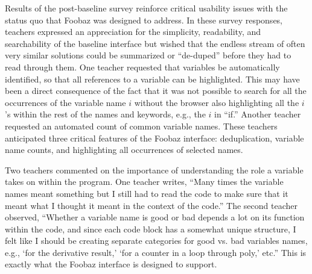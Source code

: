 \documentclass[12pt,twoside]{mitthesis}
\providecommand{\DIFaddtex}[1]{{\protect\color{blue}\uwave{#1}}} %
\providecommand{\DIFdeltex}[1]{{\protect\color{red}\sout{#1}}}                      %
\providecommand{\DIFaddbegin}{} %
\providecommand{\DIFaddend}{} %
\providecommand{\DIFdelbegin}{} %
\providecommand{\DIFdelend}{} %
\providecommand{\DIFadd}[1]{\texorpdfstring{\DIFaddtex{#1}}{#1}} %
\providecommand{\DIFdel}[1]{\texorpdfstring{\DIFdeltex{#1}}{}} %
\begin{document}
{{{{{{{{{{Results of the post-baseline survey reinforce critical usability issues with the status quo that Foobaz was designed to address. In these survey responses, teachers expressed an appreciation for the simplicity, readability, and searchability of the baseline interface but wished that the endless stream of often very similar solutions could be summarized or ``de-duped'' before they had to read through them. One teacher requested that variables be automatically identified, so that all references to a variable can be highlighted. This may have been a direct consequence of the fact that it was not possible to search for all the occurrences of the variable name \DIFdelbegin \DIFdel{$i$ }\DIFdelend \DIFaddbegin \texttt{\DIFadd{i}} \DIFaddend without the browser also highlighting all the \DIFdelbegin \DIFdel{$i$}\DIFdelend \DIFaddbegin \texttt{\DIFadd{i}}\DIFaddend 's within the rest of the names and keywords, e.g., the \DIFdelbegin \DIFdel{$i$ }\DIFdelend \DIFaddbegin \texttt{\DIFadd{i}} \DIFaddend in ``if.'' Another teacher requested an automated count of common variable names. These teachers anticipated three critical features of the Foobaz interface: deduplication, variable name counts, and highlighting all occurrences of selected names.

Two teachers commented on the importance of understanding the role a variable takes on within the program. One teacher writes, ``Many times the variable names meant something but I still had to read the code to make sure that it meant what I thought it meant in the context of the code.'' The second teacher observed, ``Whether a variable name is good or bad depends a lot on its function within the code, and since each code block has a somewhat unique structure, I felt like I should be creating separate categories for good vs. bad variables names, e.g., `for the derivative result,' `for a counter in a loop through poly,' etc.'' This is exactly what the Foobaz interface is designed to support. 

}}}}}}}}}}
\end{document}
